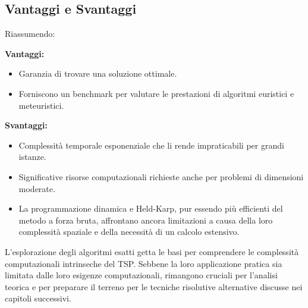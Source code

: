 \subsection{Vantaggi e Svantaggi}

Riassumendo:

\textbf{Vantaggi:}
\begin{itemize}
	\item Garanzia di trovare una soluzione ottimale.
	\item Forniscono un benchmark per valutare le prestazioni di algoritmi euristici e meteuristici.
\end{itemize}

\textbf{Svantaggi:}
\begin{itemize}
	\item Complessità temporale esponenziale che li rende impraticabili per grandi istanze.
	\item Significative risorse computazionali richieste anche per problemi di dimensioni moderate.
	\item La programmazione dinamica e Held-Karp, pur essendo più efficienti del metodo a forza bruta, affrontano ancora limitazioni a causa della loro complessità spaziale e della necessità di un calcolo estensivo.
\end{itemize}

L'esplorazione degli algoritmi esatti getta le basi per comprendere le complessità computazionali intrinseche del \gls{TSP}. Sebbene la loro applicazione pratica sia limitata dalle loro esigenze computazionali, rimangono cruciali per l'analisi teorica e per preparare il terreno per le tecniche risolutive alternative discusse nei capitoli successivi.


